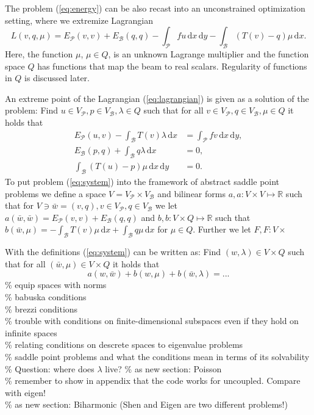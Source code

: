 \documentclass[a4paper,10pt]{article}
\newcommand{\R}{\ensuremath{\mathbb{R}}}
\newcommand{\meas}[1]{\ensuremath{\,\mathrm{d}#1}}
\newcommand{\Vp}{\ensuremath{V_{\mathcal{P}}}}
\newcommand{\Vb}{\ensuremath{V_{\mathcal{B}}}}
\newcommand{\Ep}{\ensuremath{E_{\mathcal{P}}}}
\newcommand{\Eb}{\ensuremath{E_{\mathcal{B}}}}
\begin{document}
  The problem (\ref{eq:energy}) can be also recast into an unconstrained
  optimization setting, where we extremize Lagrangian
  \begin{equation}
    \label{eq:lagrangian}
    L(v, q, \mu) = \Ep(v, v) + \Eb(q, q) - \int_{\mathcal{P}}f u \meas{x}\meas{y} -
    \int_{\mathcal{B}}(T(v) - q)\mu \meas{x}.
  \end{equation}
  Here, the function $\mu$, $\mu\in Q$, is an unknown Lagrange multiplier
  and the function space $Q$ has functions that map the beam to real scalars.
  Regularity of functions in $Q$ is discussed later.

  An extreme point of the Lagrangian (\ref{eq:lagrangian}) is given as a
  solution of the problem: Find $u\in\Vp, p\in\Vb, \lambda\in Q$ such that
  for all $v\in\Vp, q\in\Vb, \mu\in Q$ it holds that
 \begin{equation}
    \label{eq:system}
    \begin{aligned}
      \Ep(u, v) - \int_{\mathcal{B}}T(v)\lambda\meas{x} &=
      \int_{\mathcal{P}}fv\meas{x}\meas{y}, \\
      \Eb(p, q) + \int_{\mathcal{B}}q\lambda\meas{x} &= 0, \\
      \int_{\mathcal{B}}(T(u)-p)\mu\meas{x}\meas{y} &= 0.
    \end{aligned}
  \end{equation}
  To put problem (\ref{eq:system}) into the framework of abstract saddle point
  problems we define a space $V=\Vp \times \Vb$ and bilinear forms
  $a, a:V\times V\mapsto\R$ such that for $V\ni \bar{w}=(v, q), v\in\Vp, q\in\Vb$ we let
  $a(\bar{w}, \bar{w})=\Ep(v, v) + \Eb(q, q)$ and $b, b:V\times Q\mapsto\R$ such
  that $b(\bar{w}, \mu)= - \int_{\mathcal{B}}T(v)\mu\meas{x} +
  \int_{\mathcal{B}}q\mu\meas{x}$ for $\mu\in Q$. Further we let $F, F:V\times$
  
  With the definitions
  (\ref{eq:system}) can be written as: Find $(w, \lambda)\in V\times Q$ such
  that for all $(\bar{w}, \mu)\in V\times Q$ it holds that 
  \begin{equation}
    \label{eq:abstract_saddle}
    a(w, \bar{w}) + b(w, \mu) + b(\bar{w}, \lambda) = ...  
  \end{equation}
  \% equip spaces with norms\\
  \% babuska conditions \\ 
  \% brezzi conditions \\
  \% trouble with conditions on finite-dimensional subspaces even if they hold
     on infinite spaces \\
  \% relating conditions on descrete spaces to eigenvalue problems\\
  \% saddle point problems and what the conditions mean in terms of its
  solvability\\
  \% Question: where does $\lambda$ live?
  \% as new section: Poisson\\
  \% remember to show in appendix that the code works for uncoupled. Compare
  with eigen!\\
  \% as new section: Biharmonic (Shen and Eigen are two different problems!)
  
\end{document}
